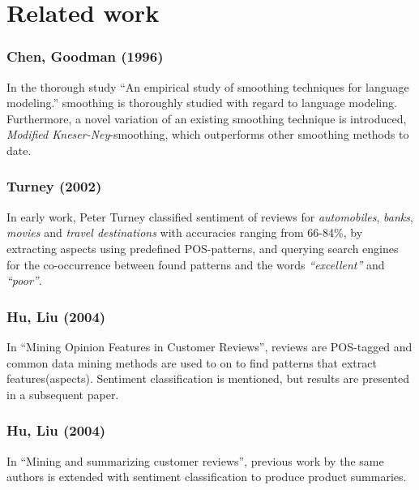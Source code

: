 \documentclass[a4paper,11pt]{kth-mag}
\begin{document}


\newpage
\section{Related work}

\subsubsection{Chen, Goodman (1996)}
In the thorough study ``An empirical study of smoothing techniques for language modeling.'' smoothing is
thoroughly studied with regard to language modeling. Furthermore, a novel variation of an existing
smoothing technique is introduced, \emph{Modified Kneser-Ney}-smoothing, which outperforms other
smoothing methods to date.


\subsubsection{Turney (2002)}
In early work, Peter Turney classified sentiment of reviews for \emph{automobiles}, \emph{banks}, \emph{movies} and \emph{travel destinations} with accuracies ranging from 66-84\%, by extracting aspects using predefined POS-patterns, and querying search engines for the co-occurrence between found patterns and the words \emph{``excellent''} and \emph{``poor''}.

\subsubsection{Hu, Liu (2004)}
In ``Mining Opinion Features in Customer Reviews'', reviews are POS-tagged and common data mining methods are used to on to find patterns that extract features(aspects). Sentiment classification is mentioned, but results are presented in a subsequent paper.

\subsubsection{Hu, Liu (2004)}
In ``Mining and summarizing customer reviews'',
previous work by the same authors is extended
with sentiment classification to produce product summaries.
\end{document}
